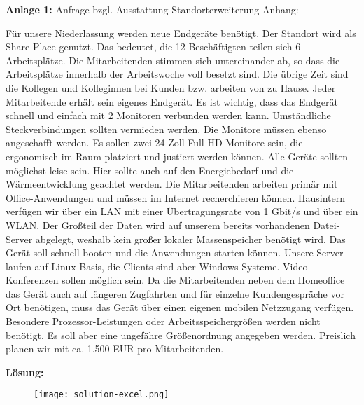 \documentclass[asp1.tex]{subfiles}
\begin{document}
\textbf{Anlage 1:}
Anfrage bzgl. Ausstattung Standorterweiterung Anhang:

Für unsere Niederlassung werden neue Endgeräte benötigt. Der Standort wird als Share-Place genutzt. Das bedeutet, die
12 Beschäftigten teilen sich 6 Arbeitsplätze. Die Mitarbeitenden stimmen sich untereinander ab, so dass die Arbeitsplätze innerhalb der Arbeitswoche voll besetzt sind. Die übrige Zeit sind die Kollegen und Kolleginnen bei Kunden bzw. arbeiten von zu Hause. Jeder Mitarbeitende erhält sein eigenes Endgerät.
Es ist wichtig, dass das Endgerät schnell und einfach mit 2 Monitoren verbunden werden kann. Umständliche Steckverbindungen sollten vermieden werden. Die Monitore müssen
ebenso angeschafft werden. Es sollen zwei 24 Zoll Full-HD Monitore sein, die ergonomisch im Raum platziert und justiert werden können. Alle Geräte sollten möglichst leise sein. Hier sollte auch auf den Energiebedarf und die Wärmeentwicklung geachtet werden.
Die Mitarbeitenden arbeiten primär mit Office-Anwendungen und müssen im Internet recherchieren können. Hausintern verfügen wir über ein LAN mit einer Übertragungsrate von
1 Gbit/s und über ein WLAN. Der Großteil der Daten wird auf unserem bereits vorhandenen Datei-Server abgelegt, weshalb kein großer lokaler Massenspeicher benötigt wird. Das Gerät soll schnell booten und die Anwendungen starten können. Unsere Server laufen auf Linux-Basis, die Clients sind aber Windows-Systeme. Video-Konferenzen sollen möglich sein.
Da die Mitarbeitenden neben dem Homeoffice das Gerät auch auf längeren Zugfahrten und für einzelne Kundengespräche vor Ort benötigen, muss das Gerät über einen eigenen mobilen Netzzugang verfügen. Besondere Prozessor-Leistungen oder Arbeitsspeichergrößen werden nicht benötigt. Es soll aber eine ungefähre Größenordnung angegeben werden.
Preislich planen wir mit ca. 1.500 EUR pro Mitarbeitenden.

\break

\textbf{Lösung:}
\begin{figure}[H]
    \texttt{[image: solution-excel.png]}
\end{figure}
\end{document}
